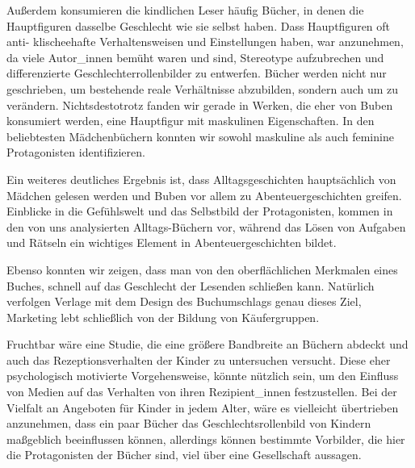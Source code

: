 Außerdem konsumieren die kindlichen Leser häufig Bücher, in denen die
Hauptfiguren dasselbe Geschlecht wie sie selbst haben. Dass Hauptfiguren
oft anti- klischeehafte Verhaltensweisen und Einstellungen haben, war
anzunehmen, da viele Autor\_innen bemüht waren und sind, Stereotype
aufzubrechen und differenzierte Geschlechterrollenbilder zu entwerfen.
Bücher werden nicht nur geschrieben, um bestehende reale Verhältnisse
abzubilden, sondern auch um zu verändern. Nichtsdestotrotz fanden wir
gerade in Werken, die eher von Buben konsumiert werden, eine Hauptfigur
mit maskulinen Eigenschaften. In den beliebtesten Mädchenbüchern konnten
wir sowohl maskuline als auch feminine Protagonisten identifizieren.

Ein weiteres deutliches Ergebnis ist, dass Alltagsgeschichten
hauptsächlich von Mädchen gelesen werden und Buben vor allem zu
Abenteuergeschichten greifen. Einblicke in die Gefühlswelt und das
Selbstbild der Protagonisten, kommen in den von uns analysierten
Alltags-Büchern vor, während das Lösen von Aufgaben und Rätseln ein
wichtiges Element in Abenteuergeschichten bildet.

Ebenso konnten wir zeigen, dass man von den oberflächlichen Merkmalen
eines Buches, schnell auf das Geschlecht der Lesenden schließen kann.
Natürlich verfolgen Verlage mit dem Design des Buchumschlags genau
dieses Ziel, Marketing lebt schließlich von der Bildung von
Käufergruppen.

Fruchtbar wäre eine Studie, die eine größere Bandbreite an Büchern
abdeckt und auch das Rezeptionsverhalten der Kinder zu untersuchen
versucht. Diese eher psychologisch motivierte Vorgehensweise, könnte
nützlich sein, um den Einfluss von Medien auf das Verhalten von ihren
Rezipient\_innen festzustellen. Bei der Vielfalt an Angeboten für Kinder
in jedem Alter, wäre es vielleicht übertrieben anzunehmen, dass ein paar
Bücher das Geschlechtsrollenbild von Kindern maßgeblich beeinflussen
können, allerdings können bestimmte Vorbilder, die hier die
Protagonisten der Bücher sind, viel über eine Gesellschaft aussagen.
